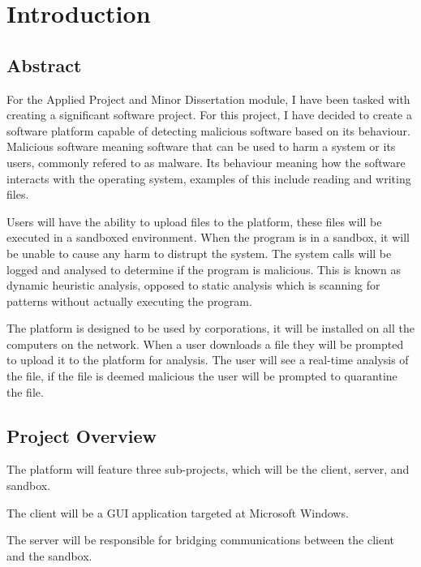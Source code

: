 \chapter{Introduction}

\section{Abstract}

For the Applied Project and Minor Dissertation module, I have been tasked with creating a significant software project.
For this project, I have decided to create a software platform capable of detecting malicious software based on its behaviour.
Malicious software meaning software that can be used to harm a system or its users, commonly refered to as malware.
Its behaviour meaning how the software interacts with the operating system, examples of this include reading and writing files.

Users will have the ability to upload files to the platform, these files will be executed in a sandboxed environment.
When the program is in a sandbox, it will be unable to cause any harm to distrupt the system.
The system calls will be logged and analysed to determine if the program is malicious.
This is known as dynamic heuristic analysis, opposed to static analysis which is scanning for patterns without actually executing the program.

The platform is designed to be used by corporations, it will be installed on all the computers on the network.
When a user downloads a file they will be prompted to upload it to the platform for analysis.
The user will see a real-time analysis of the file, if the file is deemed malicious the user will be prompted to quarantine the file.

\section{Project Overview}
The platform will feature three sub-projects, which will be the client, server, and sandbox.

The client will be a GUI application targeted at Microsoft Windows.

The server will be responsible for bridging communications between the client and the sandbox.

